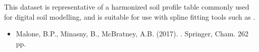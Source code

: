 \documentclass[a4paper]{book}
\begin{document}
%
\begin{Details}
This dataset is representative of a harmonized soil profile table commonly used for digital soil modelling, and is suitable for use with spline fitting tools such as .
\end{Details}
%
\begin{References}
\begin{itemize}

\item{} Malone, B.P., Minasny, B., McBratney, A.B. (2017). . Springer, Cham. 262 pp.

\end{itemize}

\end{References}
%
\begin{Examples}
\end{Examples}
\printindex{}
\end{document}
